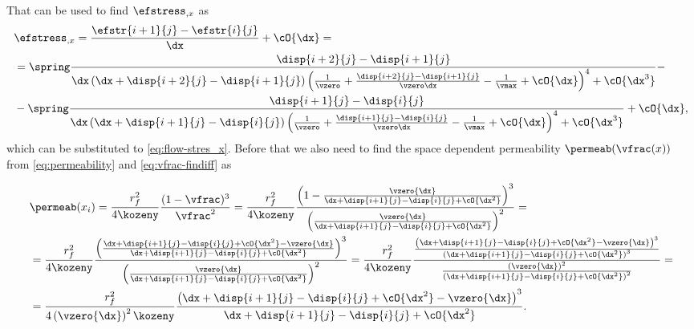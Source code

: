 \documentclass[twoside,a4paper,12pt]{article}
\begin{document}
That can be used to find $\efstress_{,x}$ as
%
\begin{align}
  &\efstress_{,x} = \frac{\efstr{i+1}{j} - \efstr{i}{j}}{\dx} + \cO{\dx}= \nonumber \\
  &=
  \spring
   \frac{\disp{i+2}{j} - \disp{i+1}{j}}{{\dx}\left(\dx + \disp{i+2}{j} - \disp{i+1}{j}\right){\left(\frac{1}{\vzero} + \frac{\disp{i+2}{j} - \disp{i+1}{j}}{\vzero\dx} -\frac{1}{\vmax}  + \cO{\dx}\right)^4} + \cO{\dx^3}}- \nonumber\\ 
  &-\spring
  \frac{\disp{i+1}{j} - \disp{i}{j}}{{\dx}\left(\dx + \disp{i+1}{j} - \disp{i}{j}\right){\left(\frac{1}{\vzero} + \frac{\disp{i+1}{j} - \disp{i}{j}}{\vzero\dx} -\frac{1}{\vmax}  + \cO{\dx}\right)^4} + \cO{\dx^3}}%
   + \cO{\dx},
\end{align}
%
which can be substituted to \eqref{eq:flow-stres_x}. Before that we
also need to find the space dependent permeability
$\permeab(\vfrac(x))$ from \eqref{eq:permeability}  and \eqref{eq:vfrac-findiff} as

\begin{align}
  &\permeab(x_i) = \frac{r_f^2}{4\kozeny} \frac{(1-\vfrac)^3}{\vfrac^2}=
    \frac{r_f^2}{4\kozeny} \frac{\left(1-\frac{\vzero{\dx}}{{\dx + \disp{i+1}{j} - \disp{i}{j} + \cO{\dx^2}}}\right)^3}{\left(\frac{\vzero{\dx}}{{\dx + \disp{i+1}{j} - \disp{i}{j} + \cO{\dx^2}}}\right)^2}=\nonumber \\
  &=\frac{r_f^2}{4\kozeny} \frac{\left(\frac{{\dx + \disp{i+1}{j} - \disp{i}{j} + \cO{\dx^2}}-\vzero{\dx}}{{\dx + \disp{i+1}{j} - \disp{i}{j} + \cO{\dx^2}}}\right)^3}{\left(\frac{\vzero{\dx}}{{\dx + \disp{i+1}{j} - \disp{i}{j} + \cO{\dx^2}}}\right)^2}
    =\frac{r_f^2}{4\kozeny} \frac{\frac{\left({\dx + \disp{i+1}{j} - \disp{i}{j} + \cO{\dx^2}}-\vzero{\dx}\right)^3}{\left({\dx + \disp{i+1}{j} - \disp{i}{j} + \cO{\dx^2}}\right)^3}}{\frac{\left(\vzero{\dx}\right)^2}{\left({\dx + \disp{i+1}{j} - \disp{i}{j} + \cO{\dx^2}}\right)^2}}=\nonumber \\
  &  =\frac{r_f^2}{4\left(\vzero{\dx}\right)^2\kozeny} {\frac{\left({\dx + \disp{i+1}{j} - \disp{i}{j} + \cO{\dx^2}}-\vzero{\dx}\right)^3}{{\dx + \disp{i+1}{j} - \disp{i}{j} + \cO{\dx^2}}}}.
\end{align}

\end{document}
